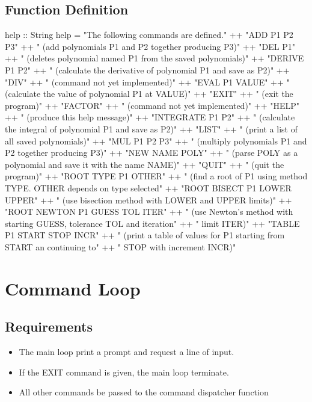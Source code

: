 \subsection{Function Definition}
\begin{code}
help :: String
help = "The following commands are defined.\n" ++
       "ADD P1 P2 P3\n" ++
       "   (add polynomials P1 and P2 together producing P3)\n" ++
       "DEL P1\n" ++
       "   (deletes polynomial named P1 from the saved polynomials)\n" ++
       "DERIVE P1 P2\n" ++
       "   (calculate the derivative of polynomial P1 and save as P2)\n" ++
       "DIV\n" ++
       "   (command not yet implemented)\n" ++
       "EVAL P1 VALUE\n" ++
       "   (calculate the value of polynomial P1 at VALUE)\n" ++
       "EXIT\n" ++
       "   (exit the program)\n" ++
       "FACTOR\n" ++
       "   (command not yet implemented)\n" ++
       "HELP\n" ++
       "   (produce this help message)\n" ++
       "INTEGRATE P1 P2\n" ++
       "   (calculate the integral of polynomial P1 and save as P2)\n" ++
       "LIST\n" ++
       "   (print a list of all saved polynomials)\n" ++
       "MUL P1 P2 P3\n" ++
       "   (multiply polynomials P1 and P2 together producing P3)\n" ++
       "NEW NAME POLY\n" ++
       "   (parse POLY as a polynomial and save it with the name NAME)\n" ++
       "QUIT\n" ++
       "   (quit the program)\n" ++
       "ROOT TYPE P1 OTHER\n" ++
       "   (find a root of P1 using method TYPE.  OTHER depends on type selected\n" ++
       "ROOT BISECT P1 LOWER UPPER\n" ++
       "   (use bisection method with LOWER and UPPER limits)\n" ++
       "ROOT NEWTON P1 GUESS TOL ITER\n" ++
       "   (use Newton's method with starting GUESS, tolerance TOL and iteration\n" ++
       "    limit ITER)\n" ++
       "TABLE P1 START STOP INCR\n" ++
       "   (print a table of values for P1 starting from START an continuing to\n" ++
       "    STOP with increment INCR)\n"
\end{code}
\section{Command Loop}
\subsection{Requirements}
\begin{itemize}
\item The main loop  print a prompt and request a line of input.
\item If the EXIT command is given, the main loop  terminate.
\item All other commands  be passed to the command dispatcher function
\end{itemize}
